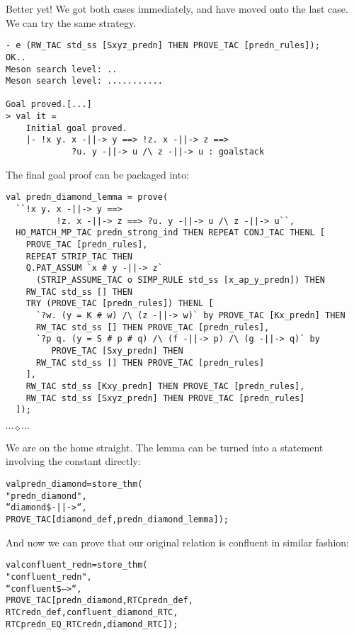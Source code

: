 \documentclass[12pt]{article}
\newcommand{\eos}{\hfill{}$\cdots\diamond\cdots$\hfill{}\vspace{5mm}}
\begin{document}
Better yet! We got both cases immediately, and have moved onto the
last case.  We can try the same strategy.
\begin{session}\begin{verbatim}
- e (RW_TAC std_ss [Sxyz_predn] THEN PROVE_TAC [predn_rules]);
OK..
Meson search level: ..
Meson search level: ...........

Goal proved.[...]
> val it =
    Initial goal proved.
    |- !x y. x -||-> y ==> !z. x -||-> z ==>
             ?u. y -||-> u /\ z -||-> u : goalstack
\end{verbatim}\end{session}
The final goal proof can be packaged into:
\begin{session}\begin{verbatim}
val predn_diamond_lemma = prove(
  ``!x y. x -||-> y ==>
          !z. x -||-> z ==> ?u. y -||-> u /\ z -||-> u``,
  HO_MATCH_MP_TAC predn_strong_ind THEN REPEAT CONJ_TAC THENL [
    PROVE_TAC [predn_rules],
    REPEAT STRIP_TAC THEN
    Q.PAT_ASSUM `x # y -||-> z`
      (STRIP_ASSUME_TAC o SIMP_RULE std_ss [x_ap_y_predn]) THEN
    RW_TAC std_ss [] THEN
    TRY (PROVE_TAC [predn_rules]) THENL [
      `?w. (y = K # w) /\ (z -||-> w)` by PROVE_TAC [Kx_predn] THEN
      RW_TAC std_ss [] THEN PROVE_TAC [predn_rules],
      `?p q. (y = S # p # q) /\ (f -||-> p) /\ (g -||-> q)` by
         PROVE_TAC [Sxy_predn] THEN
      RW_TAC std_ss [] THEN PROVE_TAC [predn_rules]
    ],
    RW_TAC std_ss [Kxy_predn] THEN PROVE_TAC [predn_rules],
    RW_TAC std_ss [Sxyz_predn] THEN PROVE_TAC [predn_rules]
  ]);
\end{verbatim}\end{session}
\eos{}

We are on the home straight.  The lemma can be turned into a statement
involving the  constant directly:
\begin{session}\begin{alltt}
val predn_diamond = store_thm(
  "predn_diamond",
  ``diamond \$-||->``,
  PROVE_TAC [diamond_def, predn_diamond_lemma]);
\end{alltt}\end{session}

And now we can prove that our original relation is confluent in
similar fashion:

\begin{session}\begin{alltt}
val confluent_redn = store_thm(
  "confluent_redn",
  ``confluent \$-->``,
  PROVE_TAC [predn_diamond, RTCpredn_def,
             RTCredn_def, confluent_diamond_RTC,
             RTCpredn_EQ_RTCredn, diamond_RTC]);
\end{alltt}\end{session}
\end{document}
